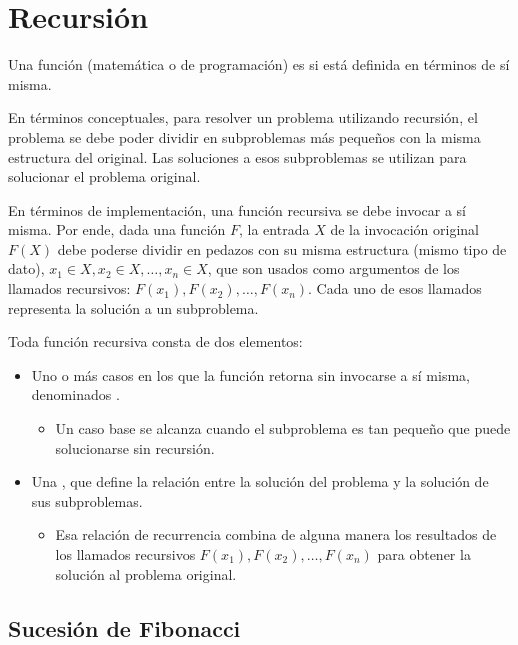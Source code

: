 \section{Recursión}

Una función (matemática o de programación) es  si está definida en términos de sí misma.

En términos conceptuales, para resolver un problema utilizando recursión, el problema se debe poder dividir en subproblemas más pequeños con la misma estructura del original. Las soluciones a esos subproblemas se utilizan para solucionar el problema original. 

En términos de implementación, una función recursiva se debe invocar a sí misma. Por ende, dada una función \(F\), la entrada \(X\) de la invocación original \(F(X)\) debe poderse dividir en pedazos con su misma estructura (mismo tipo de dato), \(x_1 \in X, x_2 \in X, \dots, x_n \in X\), que son usados como argumentos de los llamados recursivos: \(F(x_1), F(x_2), \ldots, F(x_n)\). Cada uno de esos llamados representa la solución a un subproblema.

Toda función recursiva consta de dos elementos:
\begin{itemize}
  \item Uno o más casos en los que la función retorna sin invocarse a sí misma, denominados .
  \begin{itemize}
    \item Un caso base se alcanza cuando el subproblema es tan pequeño que puede solucionarse sin recursión.
  \end{itemize}
  \item  Una , que define la relación entre la solución del problema y la solución de sus subproblemas.
  \begin{itemize}
    \item Esa relación de recurrencia combina de alguna manera los resultados de los llamados recursivos \(F(x_1), F(x_2), \ldots, F(x_n)\) para obtener la solución al problema original.
  \end{itemize}
\end{itemize}

\subsection{Sucesión de Fibonacci}

